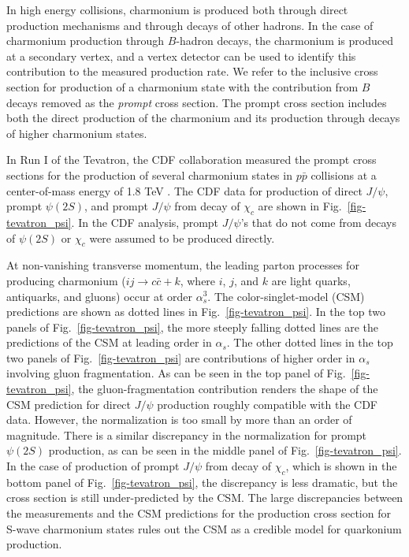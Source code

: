 In high energy collisions, charmonium is produced both through direct
production mechanisms and through decays of other hadrons. In the case of
charmonium production through $B$-hadron decays, the charmonium is
produced at a secondary vertex, and a vertex detector can be used to
identify this contribution to the measured production rate.  We refer to
the inclusive cross section for production of a charmonium state with
the contribution from $B$ decays removed as the {\it prompt} cross
section. The prompt cross section includes both 
the direct production of the charmonium and its
production through decays of higher charmonium states.

In Run I of the Tevatron, the CDF collaboration measured the prompt
cross sections for the production of several charmonium states
in $p \bar p$ collisions at
a center-of-mass energy of 1.8 TeV \cite{Abe:1997jz,Abe:1997yz}. The
CDF data for production of direct $J/\psi$, prompt $\psi(2S)$, and
prompt $J/\psi$ from decay of $\chi_c$ are shown in
Fig.~\ref{fig-tevatron_psi}. In the CDF analysis, prompt $J/\psi$'s
that do not come from decays of $\psi(2S)$ or $\chi_c$ were assumed to
be produced directly. 

At non-vanishing transverse momentum, the leading parton processes for
producing charmonium ($ij \rightarrow c \bar{c} + k$, where $i$, $j$,
and $k$ are light quarks, antiquarks, and gluons) occur at order
$\alpha_s^3$. The color-singlet-model (CSM) predictions
are shown as dotted lines in Fig.~\ref{fig-tevatron_psi}.  In the top
two panels of Fig.~\ref{fig-tevatron_psi}, the more steeply falling
dotted lines are the predictions of the CSM at leading order in
$\alpha_s$. The other dotted lines in the top two panels of
Fig.~\ref{fig-tevatron_psi} are contributions of higher order in
$\alpha_s$ involving gluon fragmentation.  As can be seen in the top
panel of Fig.~\ref{fig-tevatron_psi}, the gluon-fragmentation
contribution renders the shape of the CSM prediction for direct
$J/\psi$ production roughly compatible with the CDF data. However, the
normalization is too small by more than an order of magnitude. There
is a similar discrepancy in the normalization for prompt $\psi(2S)$
production, as can be seen in the middle panel of
Fig.~\ref{fig-tevatron_psi}. In the case of production of prompt
$J/\psi$ from decay of $\chi_c$, which is shown in the bottom panel of
Fig.~\ref{fig-tevatron_psi}, the discrepancy is less dramatic, but the
cross section is still under-predicted by the CSM.  The large
discrepancies between the measurements and the CSM predictions for the
production cross section for S-wave charmonium states rules out the
CSM as a credible model for quarkonium production.

